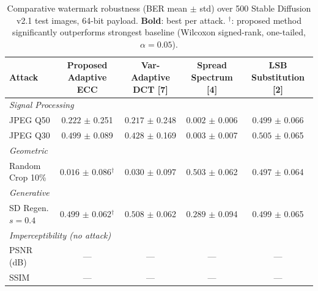 \begin{table}[t]
  \caption{Comparative watermark robustness (BER mean $\pm$ std) over 500 Stable
    Diffusion v2.1 test images, 64-bit payload. \textbf{Bold}: best per attack.
    $^\dagger$: proposed method significantly outperforms strongest baseline
    (Wilcoxon signed-rank, one-tailed, $\alpha = 0.05$).}
  \label{tab:main_results}
  \centering
  \begin{tabular}{lcccc}
    \toprule
    \textbf{Attack} & \textbf{Proposed Adaptive ECC} & \textbf{Var-Adaptive DCT [7]} & \textbf{Spread Spectrum [4]} & \textbf{LSB Substitution [2]} \\
    \midrule
    \multicolumn{5}{l}{\textit{Signal Processing}} \\
    \quad JPEG Q50 & $0.222$ $\pm$ 0.251 & $0.217$ $\pm$ 0.248 & $\mathbf{0.002}$ $\pm$ 0.006 & $0.499$ $\pm$ 0.066 \\
    \quad JPEG Q30 & $0.499$ $\pm$ 0.089 & $0.428$ $\pm$ 0.169 & $\mathbf{0.003}$ $\pm$ 0.007 & $0.505$ $\pm$ 0.065 \\
    \midrule
    \multicolumn{5}{l}{\textit{Geometric}} \\
    \quad Random Crop 10\% & $\mathbf{0.016}$ $\pm$ 0.086$^{\dagger}$ & $0.030$ $\pm$ 0.097 & $0.503$ $\pm$ 0.062 & $0.497$ $\pm$ 0.064 \\
    \midrule
    \multicolumn{5}{l}{\textit{Generative}} \\
    \quad SD Regen. $s=0.4$ & $0.499$ $\pm$ 0.062$^{\dagger}$ & $0.508$ $\pm$ 0.062 & $\mathbf{0.289}$ $\pm$ 0.094 & $0.499$ $\pm$ 0.065 \\
    \midrule
    \multicolumn{5}{l}{\textit{Imperceptibility (no attack)}} \\
    \quad PSNR (dB) & --- & --- & --- & --- \\
    \quad SSIM      & --- & --- & --- & --- \\
    \bottomrule
  \end{tabular}
\end{table}